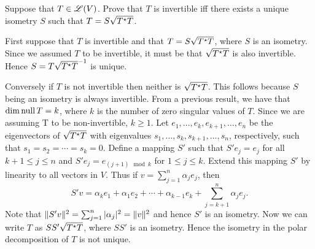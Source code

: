 \begin{exercise}
Suppose that $T \in \mathscr{L}(V)$. Prove that $T$ is invertible iff there exists
a unique isometry $S$ such that $T = S \sqrt{T^{\star} T}$.
\end{exercise}
\begin{solution}
First suppose that $T$ is invertible and that $T = S \sqrt{T^{\star} T}$,
where $S$ is an isometry. Since we assumed $T$ to be invertible, it must be that
$\sqrt{T^{\star} T}$ is also invertible. Hence $S = T \sqrt{T^{\star} T}^{-1}$ is unique.

Conversely if $T$ is not invertible then neither is $\sqrt{T^{\star} T}$. This follows
because $S$ being an isometry is always invertible. From a previous result, we have
that $\dim \operatorname{null} T = k$, where $k$ is the number of zero singular values of $T$.
Since we are assuming T to be non-invertible, $k \geq 1$. Let
$e_1, \ldots, e_k, e_{k + 1}, \ldots, e_n$ be the eigenvectors of $\sqrt{T^{\star} T}$
with eigenvalues $s_1, \ldots, s_k, s_{k + 1}, \ldots, s_n$, respectively,
such that $s_1 = s_2 = \cdots = s_k = 0$. Define a mapping $S'$ such that
$S' e_j = e_j$ for all $k + 1 \leq j \leq n$ and $S' e_j = e_{(j + 1) \mod k}$
for $1 \leq j \leq k$. Extend this mapping $S'$ by linearity to all vectors in $V$.
Thus if $v = \sum_{j = 1}^n \alpha_j e_j$, then
\[
    S' v = \alpha_k e_1 + \alpha_1 e_2 + \cdots + \alpha_{k - 1} e_{k} +
            \sum_{j = k + 1}^n \alpha_j e_j.
\]
Note that $\lVert S' v\rVert^2 = \sum_{j = 1}^n |\alpha_j|^2 = \lVert v\rVert^2$ and hence
$S'$ is an isometry. Now we can write $T$ as $S S' \sqrt{T^{\star} T}$, where $S S'$
is an isometry. Hence the isometry in the polar decomposition of $T$ is not unique.
\end{solution}

